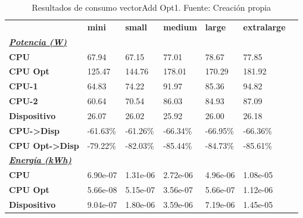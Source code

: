 \begin{table}[H]
    \centering
    \begin{tabular}{lllllll}
    \rowcolor[HTML]{DAE8FC} \ & \textbf{mini} & \textbf{small} & \textbf{medium} & \textbf{	large} & \textbf{	extralarge} \\
    \cellcolor[HTML]{DAE8FC} \textbf{\textbf{{\emph{{\underline{{Potencia (W)}}}}}}} &  &  &  & 	 & 	 \\
    \rowcolor[HTML]{EFEFEF} \cellcolor[HTML]{DAE8FC} \textbf{CPU} & 67.94 & 67.15 & 77.01 & 	78.67 & 	77.85 \\
    \cellcolor[HTML]{DAE8FC} \textbf{CPU Opt} & 125.47 & 144.76 & 178.01 & 	170.29 & 	181.92 \\
    \rowcolor[HTML]{EFEFEF} \cellcolor[HTML]{DAE8FC} \textbf{\quad CPU-1} & 64.83 & 74.22 & 91.97 & 	85.36 & 	94.82 \\
    \cellcolor[HTML]{DAE8FC} \textbf{\quad CPU-2} & 60.64 & 70.54 & 86.03 & 	84.93 & 	87.09 \\
    \rowcolor[HTML]{EFEFEF} \cellcolor[HTML]{DAE8FC} \textbf{Dispositivo} & 26.07 & 26.02 & 25.92 & 	26.00 & 	26.18 \\
    \cellcolor[HTML]{DAE8FC} \textbf{CPU->Disp} & -61.63\% & -61.26\% & -66.34\% & 	-66.95\% & 	-66.36\% \\
    \rowcolor[HTML]{EFEFEF} \cellcolor[HTML]{DAE8FC} \textbf{CPU Opt->Disp} & -79.22\% & -82.03\% & -85.44\% & 	-84.73\% & 	-85.61\% \\
    \cellcolor[HTML]{DAE8FC} \textbf{\textbf{{\emph{{\underline{{Energía (kWh)}}}}}}} &  &  &  & 	 & 	 \\
    \rowcolor[HTML]{EFEFEF} \cellcolor[HTML]{DAE8FC} \textbf{CPU} & 6.90e-07 & 1.31e-06 & 2.72e-06 & 	4.96e-06 & 	1.08e-05 \\
    \cellcolor[HTML]{DAE8FC} \textbf{CPU Opt} & 5.66e-08 & 5.15e-07 & 3.56e-07 & 	5.66e-07 & 	1.12e-06 \\
    \rowcolor[HTML]{EFEFEF} \cellcolor[HTML]{DAE8FC} \textbf{Dispositivo} & 9.04e-07 & 1.80e-06 & 3.59e-06 & 	7.19e-06 & 	1.45e-05 \\
    \end{tabular}
    \caption[Resultados de consumo vectorAdd Opt1]{{Resultados de consumo vectorAdd Opt1. Fuente: Creación propia}}
    \label{table_test_vectorAdd_Opt1_hw_powerResults}
\end{table}